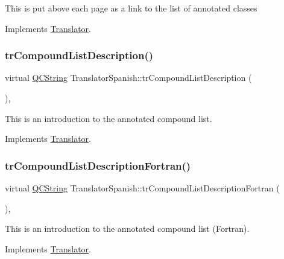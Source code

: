 This is put above each page as a link to the list of annotated classes 

Implements \mbox{\hyperlink{class_translator}{Translator}}.

\mbox{\label{class_translator_spanish_a429f88c16c0c26eea31e94fc40ebca63}} 
\subsubsection{\texorpdfstring{trCompoundListDescription()}{trCompoundListDescription()}}
{\footnotesize\ttfamily virtual \mbox{\hyperlink{class_q_c_string}{Q\+C\+String}} Translator\+Spanish\+::tr\+Compound\+List\+Description (\begin{DoxyParamCaption}{ }\end{DoxyParamCaption})\hspace{0.3cm}{\ttfamily [inline]}, {\ttfamily [virtual]}}

This is an introduction to the annotated compound list. 

Implements \mbox{\hyperlink{class_translator}{Translator}}.

\mbox{\label{class_translator_spanish_a2f5a1491dd339488fce0802ab9028411}} 
\subsubsection{\texorpdfstring{trCompoundListDescriptionFortran()}{trCompoundListDescriptionFortran()}}
{\footnotesize\ttfamily virtual \mbox{\hyperlink{class_q_c_string}{Q\+C\+String}} Translator\+Spanish\+::tr\+Compound\+List\+Description\+Fortran (\begin{DoxyParamCaption}{ }\end{DoxyParamCaption})\hspace{0.3cm}{\ttfamily [inline]}, {\ttfamily [virtual]}}

This is an introduction to the annotated compound list (Fortran). 

Implements \mbox{\hyperlink{class_translator}{Translator}}.

